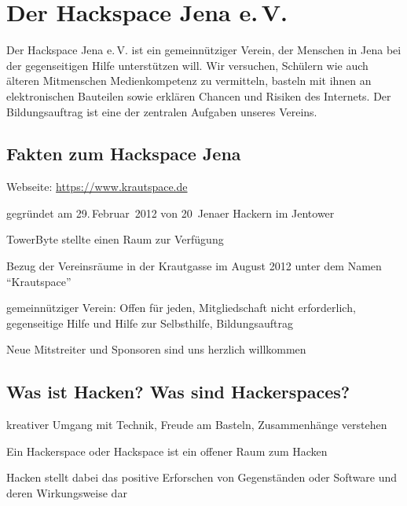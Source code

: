 \documentclass[a4paper,12pt,twoside]{scrartcl}
\begin{document}
\thispagestyle{empty}

\section*{Der Hackspace Jena e.\,V.}
Der Hackspace Jena e.\,V. ist ein gemeinnütziger Verein, der Menschen
in Jena bei der gegenseitigen Hilfe unterstützen will. Wir versuchen,
Schülern wie auch älteren Mitmenschen Medienkompetenz zu vermitteln,
basteln mit ihnen an elektronischen Bauteilen sowie erklären Chancen
und Risiken des Internets. Der Bildungsauftrag ist eine der zentralen
Aufgaben unseres Vereins.

\subsection*{Fakten zum Hackspace Jena}
\begin{compactitem}
\item Webseite: \url{https://www.krautspace.de}
\item gegründet am 29.\,Februar~2012 von 20~Jenaer Hackern im Jentower
\item TowerByte stellte einen Raum zur Verfügung
\item Bezug der Vereinsräume in der Krautgasse im August 2012 unter
  dem Namen \enquote{Krautspace}
\item gemeinnütziger Verein: Offen für jeden, Mitgliedschaft nicht 
  erforderlich, gegenseitige Hilfe und Hilfe zur Selbsthilfe, 
  Bildungsauftrag
\item Neue Mitstreiter und Sponsoren sind uns herzlich willkommen
\end{compactitem}

\subsection*{Was ist Hacken? Was sind Hackerspaces?}
\begin{compactitem}
\item kreativer Umgang mit Technik, Freude am Basteln, Zusammenhänge verstehen
\item Ein Hackerspace oder Hackspace ist ein offener Raum zum Hacken
\item Hacken stellt dabei das positive Erforschen von Gegenständen oder 
  Software und deren Wirkungsweise dar
\end{compactitem}
\end{document}
